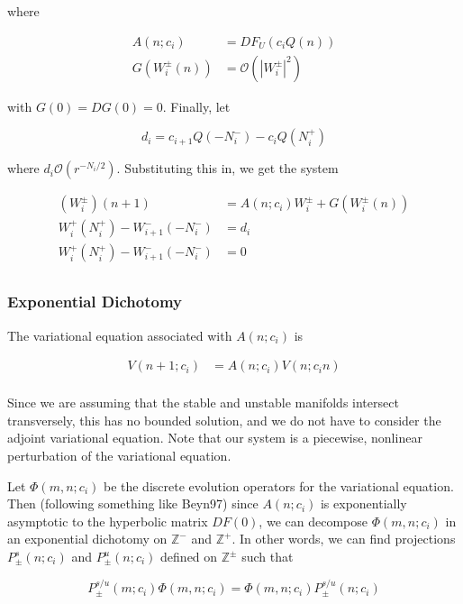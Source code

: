 \documentclass[12pt]{article}
\def\Z{{\mathbb Z}}
\begin{document}
where

\begin{align*}
A(n; c_i) &= DF_{U}(c_i Q(n))\\
G(W_i^\pm(n)) &= \mathcal{O}(|W_i^\pm|^2)
\end{align*}

with $G(0) = DG(0) = 0$. Finally, let 

\begin{equation}
d_i = c_{i+1} Q(-N_i^-) - c_i Q(N_i^+)
\end{equation}

where $d_i \mathcal{O}(r^{-N_i/2})$. Substituting this in, we get the system

\begin{align}
(W_i^\pm)(n+1) &= A(n; c_i) W_i^\pm + G(W_i^\pm(n)) \\
W_i^+(N_i^+) - W_{i+1}^-(-N_i^-) &= d_i \\
W_i^+(N_i^+) - W_{i+1}^-(-N_i^-) &= 0 \\
\end{align}

\subsubsection{Exponential Dichotomy}

The variational equation associated with $A(n; c_i)$ is

\begin{align}
V(n+1; c_i) &= A(n; c_i) V(n; c_in) \label{vareq} \\
\end{align}

Since we are assuming that the stable and unstable manifolds intersect transversely, this has no bounded solution, and we do not have to consider the adjoint variational equation. Note that our system is a piecewise, nonlinear perturbation of the variational equation.

Let $\Phi(m, n; c_i)$ be the discrete evolution operators for the variational equation. Then (following something like Beyn97) since $A(n; c_i)$ is exponentially asymptotic to the hyperbolic matrix $DF(0)$, we can decompose $\Phi(m, n; c_i)$ in an exponential dichotomy on $\Z^-$ and $\Z^+$. In other words, we can find projections $P_\pm^s(n; c_i)$ and $P_\pm^u(n; c_i)$ defined on $\Z^\pm$ such that

\begin{equation}\label{projcommute}
P_\pm^{s/u}(m; c_i) \Phi(m, n; c_i) =  \Phi(m, n; c_i) P_\pm^{s/u}(n; c_i)
\end{equation}
\end{document}
